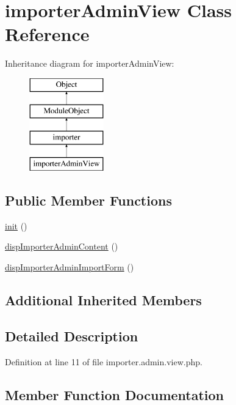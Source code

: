 \hypertarget{classimporterAdminView}{}\section{importer\+Admin\+View Class Reference}
\label{classimporterAdminView}
Inheritance diagram for importer\+Admin\+View\+:\begin{figure}[H]
\begin{center}
\leavevmode
\includegraphics[height=4.000000cm]{classimporterAdminView}
\end{center}
\end{figure}
\subsection*{Public Member Functions}
\begin{DoxyCompactItemize}
\item 
\hyperlink{classimporterAdminView_a80f9a6e2e9051598556993dcbbe8027d}{init} ()
\item 
\hyperlink{classimporterAdminView_acf9cbe2b56436ba34ad0b8221993beba}{disp\+Importer\+Admin\+Content} ()
\item 
\hyperlink{classimporterAdminView_a5b4fa9f27407cc697b65505fafa4fc11}{disp\+Importer\+Admin\+Import\+Form} ()
\end{DoxyCompactItemize}
\subsection*{Additional Inherited Members}


\subsection{Detailed Description}


Definition at line 11 of file importer.\+admin.\+view.\+php.



\subsection{Member Function Documentation}
\hypertarget{classimporterAdminView_acf9cbe2b56436ba34ad0b8221993beba}{}\label{classimporterAdminView_acf9cbe2b56436ba34ad0b8221993beba} 
